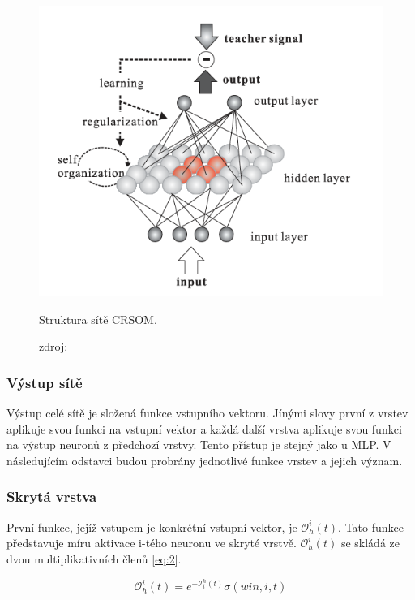 \documentclass[thesis=M,czech]{FITthesis}[2012/06/26]
\begin{document}
\begin{figure}[htbp]
\begin{center}
	\includegraphics[scale=0.6]{crsom_structure}
\caption{Struktura sítě CRSOM.}
\label{fig:crsom_structure}
  \caption*{zdroj:\cite{hartono14}}
\end{center}
\end{figure}
 
 

\subsubsection*{Výstup sítě}
Výstup celé sítě je složená funkce vstupního vektoru. 
Jínými slovy první z vrstev aplikuje svou funkci na vstupní vektor a každá další vrstva aplikuje svou funkci na výstup neuronů z předchozí vrstvy. Tento přístup je stejný jako u MLP. V následujícím odstavci budou probrány jednotlivé funkce vrstev a jejich význam.

\subsubsection*{Skrytá vrstva}
První funkce, jejíž vstupem je konkrétní vstupní vektor, je $ \mathcal{O}_h^i(t) $. Tato funkce představuje míru aktivace i-tého neuronu ve skryté vrstvě. $ \mathcal{O}_h^i(t) $ se skládá ze dvou multiplikativních členů \ref{eq:2}.

\begin{equation} \label{eq:2}
    \mathcal{O}_h^i(t) = e^{-\mathcal{I}_i^h(t)} \sigma(win, i, t)
\end{equation}
\end{document}
